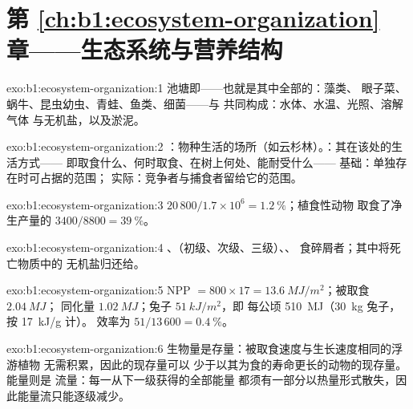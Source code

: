 \section*{第 \ref{ch:b1:ecosystem-organization} 章——生态系统与营养结构}

\begin{solution}{exo:b1:ecosystem-organization:1}
池塘即——也就是其中全部的：藻类、
眼子菜、蜗牛、昆虫幼虫、青蛙、鱼类、细菌——与
共同构成：水体、水温、光照、溶解气体
与无机盐，以及淤泥。
\end{solution}

\begin{solution}{exo:b1:ecosystem-organization:2}
：物种生活的场所（如云杉林）。：其在该处的生活方式——
即取食什么、何时取食、在树上何处、能耐受什么——
基础：单独存在时可占据的范围；
实际：竞争者与捕食者留给它的范围。
\end{solution}

\begin{solution}{exo:b1:ecosystem-organization:3}
$20\,800/1.7\times 10^6 = \qty{1.2}{\%}$；植食性动物
取食了净生产量的 $3400/8800 = \qty{39}{\%}$。
\end{solution}

\begin{solution}{exo:b1:ecosystem-organization:4}
、（初级、次级、三级）、、
食碎屑者；其中将死亡物质中的
无机盐归还给。
\end{solution}

\begin{solution}{exo:b1:ecosystem-organization:5}
NPP $= 800\times 17 = \qty{13.6}{MJ/m^2}$；被取食 $\qty{2.04}{MJ}$；
同化量 $\qty{1.02}{MJ}$；兔子 $\qty{51}{kJ/m^2}$，即
每公顷 \qty{510}{MJ}（\qty{30}{kg} 兔子，按 \qty{17}{kJ/g} 计）。
效率为 $51/13\,600 = \qty{0.4}{\%}$。
\end{solution}

\begin{solution}{exo:b1:ecosystem-organization:6}
生物量是存量：被取食速度与生长速度相同的浮游植物
无需积累，因此的现存量可以
少于以其为食的寿命更长的动物的现存量。能量则是
流量：每一从下一级获得的全部能量
都须有一部分以热量形式散失，因此能量流只能逐级减少。
\end{solution}

